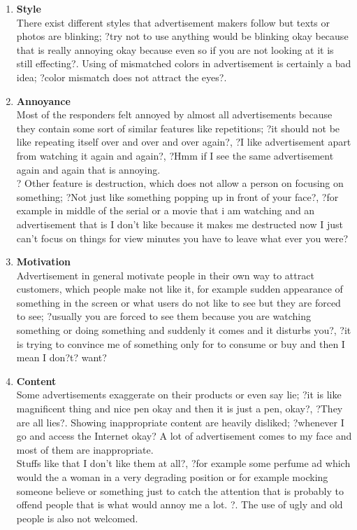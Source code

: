 \begin{enumerate}
\item \textbf{Style} \\
There exist different styles that advertisement makers follow but texts or photos are blinking; ?try not to use anything would be blinking okay because that is really annoying okay because even so if you are not looking at it is still effecting?. Using of mismatched colors in advertisement is certainly a bad idea; ?color mismatch does not attract the eyes?.

\item \textbf{Annoyance} \\
Most of the responders felt annoyed by almost all advertisements because they contain some sort of similar features like repetitions; ?it should not be like repeating itself over and over and over again?, ?I like advertisement apart from watching it again and again?, ?Hmm if I see the same advertisement again and again that is annoying. \\
? Other feature is destruction, which does not allow a person on focusing on something; ?Not just like something popping up in front of your face?, ?for example in middle of the serial or a movie that i am watching and an advertisement that is I don't like because it makes me destructed now I just can't focus on things for view minutes you have to leave what ever you were?

\item \textbf{Motivation} \\
Advertisement in general motivate people in their own way to attract customers, which people make not like it, for example sudden appearance of something in the screen or what users do not like to see but they are forced to see; ?usually you are forced to see them because you are watching something or doing something and suddenly it comes and it disturbs you?, ?it is trying to convince me of something only for to consume or buy and then I mean I don?t? want?

\item \textbf{Content} \\
Some advertisements exaggerate on their products or even say lie; ?it is like magnificent thing and nice pen okay and then it is just a pen, okay?, ?They are all lies?. Showing inappropriate content are heavily disliked; ?whenever I go and access the Internet okay? A lot of advertisement comes to my face and most of them are inappropriate. \\
Stuffs like that I don't like them at all?, ?for example some perfume ad which would the a woman in a very degrading position or for example mocking someone believe or something just to catch the attention that is probably to offend people that is what would annoy me a lot. ?. The use of ugly and old people is also not welcomed.


\end{enumerate}
